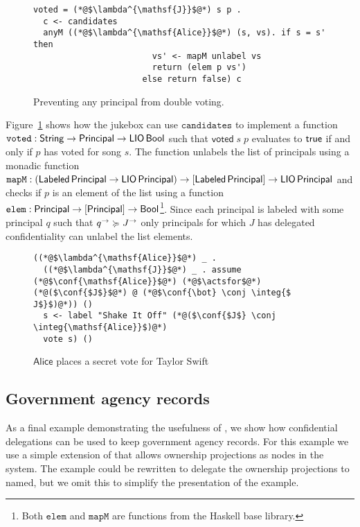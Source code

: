 \begin{figure}
\centering
\begin{lstlisting}
voted = (*@$\lambda^{\mathsf{J}}$@*) s p .
  c <- candidates
  anyM ((*@$\lambda^{\mathsf{Alice}}$@*) (s, vs). if s = s' then
                        vs' <- mapM unlabel vs
                        return (elem p vs')
                      else return false) c
\end{lstlisting}
\caption{Preventing any principal from double voting.}
\label{fig:prevent-double-voting}
\end{figure}

Figure~\ref{fig:prevent-double-voting} shows how the jukebox can use $\mathtt{candidates}$ to implement a function $\mathtt{voted}: \mathsf{String} \to \mathsf{Principal} \to \mathsf{LIO}\,\mathsf{Bool}$ such that $\mathsf{voted}\; s\; p$ evaluates to $\mathsf{true}$ if and only if $p$ has voted for song $s$. The function unlabels the list of principals using a monadic function $\mathtt{mapM}: (\mathsf{Labeled}\,\mathsf{Principal} \to \mathsf{LIO}\,\mathsf{Principal}) \to \lbrack\mathsf{Labeled}\,\mathsf{Principal}\rbrack \to \mathsf{LIO}\,\mathsf{Principal}$ and checks if $p$ is an element of the list using a function $\mathtt{elem}: \mathsf{Principal} \to \lbrack\mathsf{Principal}\rbrack \to \mathsf{Bool}$\footnote{Both $\mathtt{elem}$ and $\mathtt{mapM}$ are functions from the Haskell base library.}. Since each principal is labeled with some principal $q$ such that $q^{\rightarrow} \succcurlyeq J^{\rightarrow}$ only principals for which $J$ has delegated confidentiality can unlabel the list elements.

\begin{figure}
\centering
\begin{lstlisting}
((*@$\lambda^{\mathsf{Alice}}$@*) _ .
  ((*@$\lambda^{\mathsf{J}}$@*) _ . assume (*@$\conf{\mathsf{Alice}}$@*) (*@$\actsfor$@*) (*@($\conf{$J$}$@*) @ (*@$\conf{\bot} \conj \integ{$ J$}$)@*)) ()
  s <- label "Shake It Off" (*@($\conf{$J$} \conj \integ{\mathsf{Alice}}$)@*)
  vote s) ()
\end{lstlisting}
\caption{$\mathsf{Alice}$ places a secret vote for Taylor Swift}
\label{fig:jukebox-alice-votes-for-taylor-swift}
\end{figure}

\subsection{Government agency records}
As a final example demonstrating the usefulness of \lang, we show how confidential delegations can be used to keep government agency records. For this example we use a simple extension of \lang{} that allows ownership projections as nodes in the system. The example could be rewritten to delegate the ownership projections to named, but we omit this to simplify the presentation of the example.

